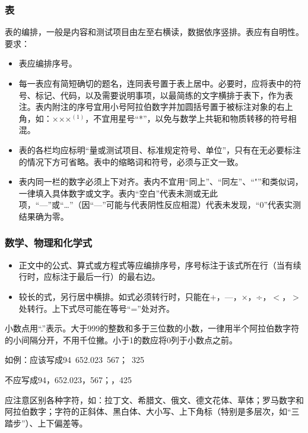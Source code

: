 \subsubsection{表}

表的编排，一般是内容和测试项目由左至右横读，数据依序竖排。表应有自明性。要求：

\begin{itemize}[leftmargin=2em]
    \item[a.] 表应编排序号。
    \item[b.] 每一表应有简短确切的题名，连同表号置于表上居中。必要时，应将表中的符号、标记、代码，以及需要说明事项，以最简练的文字横排于表下，作为表注。表内附注的序号宜用小号阿拉伯数字并加圆括号置于被标注对象的右上角，如：×××$^{(1)}$，不宜用星号``*''，以免与数学上共轭和物质转移的符号相混。
    \item[c.] 表的各栏均应标明``量或测试项目、标准规定符号、单位''，只有在无必要标注的情况下方可省略。表中的缩略词和符号，必须与正文一致。
    \item[d.] 表内同一栏的数字必须上下对齐。表内不宜用``同上''、``同左''、``"''和类似词，一律填入具体数字或文字。表内``空白''代表未测或无此项，``—''或``…''（因``—''可能与代表阴性反应相混）代表未发现，``0''代表实测结果确为零。
\end{itemize}

\subsubsection{数学、物理和化学式}

\begin{itemize}[leftmargin=2em]
    \item[a.] 正文中的公式、算式或方程式等应编排序号，序号标注于该式所在行（当有续行时，应标注于最后一行）的最右边。
    \item[b.] 较长的式，另行居中横排。如式必须转行时，只能在+，—，×，÷，$<$，$>$处转行。上下式尽可能在等号``=''处对齐。
\end{itemize}

小数点用``.''表示。大于999的整数和多于三位数的小数，一律用半个阿拉伯数字符的小间隔分开，不用千位撇。小于1的数应将0列于小数点之前。

如例：应该写成94\ 652.023\ 567；\ 325

不应写成94，652.023，567；，425

应注意区别各种字符，如：拉丁文、希腊文、俄文、德文花体、草体；罗马数字和阿拉伯数字；字符的正斜体、黑白体、大小写、上下角标（特别是多层次，如``三踏步''）、上下偏差等。

